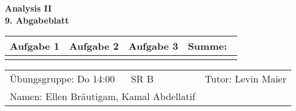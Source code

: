 \documentclass[a4paper, 12pt]{scrartcl}
\begin{document}
\begin{center}
    \textbf{Analysis II\\9. Abgabeblatt}\\[2em]
	\def\arraystretch{2}
    \begin{tabular}{|l|l|l||p{18mm}|}
        \hline
         Aufgabe 1 & Aufgabe 2 & Aufgabe 3 & Summe:~ \\
         \hline &&&\\
         \hline  
    \end{tabular}
\end{center}
\begingroup
\def\arraystretch{1.5}
\begin{tabular}{p{}p{}}
	\hline
    Übungsgruppe: Do 14:00 ~~ SR B& Tutor: Levin Maier \\
    Namen: Ellen Bräutigam, Kamal Abdellatif &\\
    \hline
\end{tabular}
\endgroup\\
\end{document}
